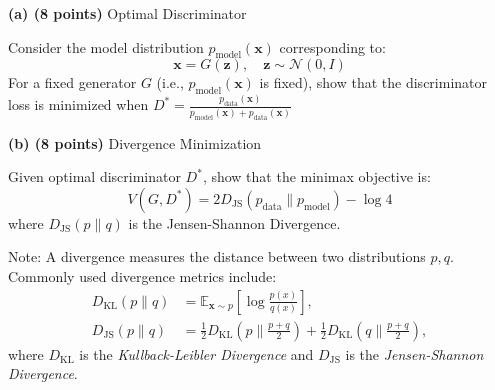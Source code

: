 \documentclass[12pt]{article}%
\begin{document}



\newpage




\textbf{(a) (8 points)} Optimal Discriminator

Consider the model distribution $p_{\text{model}}(\mathbf{x})$ corresponding to:
\[
  \mathbf{x} = G(\mathbf{z}), \quad \mathbf{z} \sim \mathcal{N}(0, I)
\]
For a fixed generator $G$ (i.e., $p_{\text{model}}(\mathbf{x})$ is fixed), show that the discriminator loss is minimized when $D^* = \frac{p_{\text{data}}(\mathbf{x})}{p_{\text{model}}(\mathbf{x}) + p_{\text{data}}(\mathbf{x})}$

\newpage

\textbf{(b) (8 points)} Divergence Minimization

Given optimal discriminator $D^*$, show that the minimax objective is:
\[
  V(G, D^*) = 2D_{\text{JS}}(p_{\text{data}} \| p_{\text{model}}) -\log 4
\]
where $D_{\text{JS}}(p\|q)$ is the Jensen-Shannon Divergence.

Note: A divergence measures the distance between two distributions $p, q$. Commonly used divergence metrics include:
\begin{equation*}
  \begin{split}
    D_{\text{KL}}(p \| q)  & = \mathbb{E}_{\mathbf{x} \sim p} \left[ \log \frac{p(x)}{q(x)} \right],
    \\ 
    D_{\text{JS}}(p \| q) & = \frac{1}{2} D_{\text{KL}}(p \| \frac{p + q}{2}) + \frac{1}{2} D_{\text{KL}}(q \| \frac{p + q}{2}),
  \end{split}
\end{equation*}
where $D_{\text{KL}}$ is the \textit{Kullback-Leibler Divergence} and $D_{\text{JS}}$ is the \textit{Jensen-Shannon Divergence}.
\end{document}
